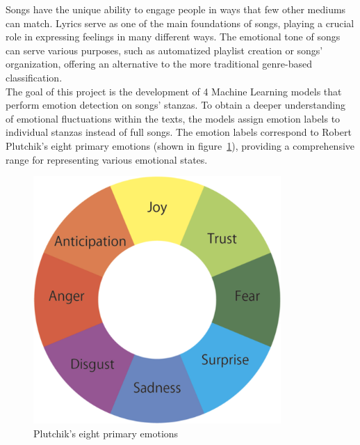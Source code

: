 Songs have the unique ability to engage people in ways that few other mediums can match. 
Lyrics serve as one of the main foundations of songs, playing a crucial role in
expressing feelings in many different ways.
The emotional tone of songs can serve various purposes, such as
automatized playlist creation or songs' organization,
offering an alternative to the more traditional genre-based classification. \\
The goal of this project is the development of 4 Machine Learning models
that perform emotion detection on songs' stanzas. To obtain a deeper
understanding of emotional fluctuations within the texts, the models assign
emotion labels to individual stanzas instead of full songs.
The emotion labels correspond to Robert Plutchik's eight primary emotions (shown in figure~\ref{fig:primary_emotions}), providing a comprehensive range for representing various emotional states.\\
\begin{figure}[H]
    \centering
    \includegraphics[scale= 0.30]{pictures/plutchik_primary_emotions.png}
    \caption{Plutchik's eight primary emotions}
    \label{fig:primary_emotions}
\end{figure}

